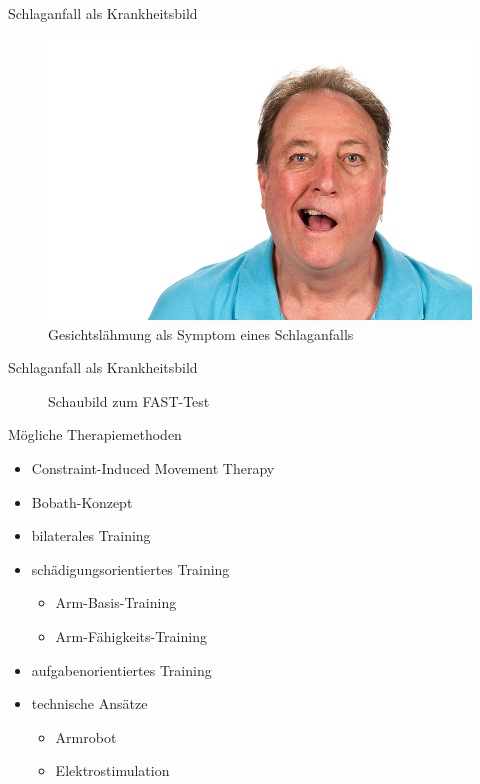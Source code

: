 \documentclass[hyphens]{beamer}
\begin{document}
\begin{frame}{Schlaganfall als Krankheitsbild}
\begin{figure}
	\includegraphics[scale=1.1]{pics/laehm}
	\caption{Gesichtslähmung als Symptom eines Schlaganfalls}
\end{figure}
\end{frame}

\begin{frame}{Schlaganfall als Krankheitsbild}
\begin{figure}
	
	\caption{Schaubild zum FAST-Test}
\end{figure}
\end{frame}

\begin{frame}{Mögliche Therapiemethoden}
	\begin{itemize}
		\item Constraint-Induced Movement Therapy
		\item Bobath-Konzept
		\item bilaterales Training
		\item schädigungsorientiertes Training
		\begin{itemize}
			\item Arm-Basis-Training
			\item Arm-Fähigkeits-Training
		\end{itemize}
		\item aufgabenorientiertes Training
		\item technische Ansätze
		\begin{itemize}
			\item Armrobot
			\item Elektrostimulation
		\end{itemize}
	\end{itemize}
\end{frame}
\end{document}
